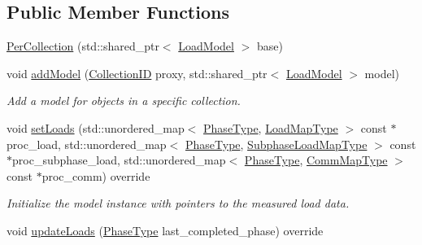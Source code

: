\subsection*{Public Member Functions}
\begin{DoxyCompactItemize}
\item 
\hyperlink{structvt_1_1vrt_1_1collection_1_1balance_1_1_per_collection_aa149a252fec1619bd947e53e3a66b854}{Per\+Collection} (std\+::shared\+\_\+ptr$<$ \hyperlink{classvt_1_1vrt_1_1collection_1_1balance_1_1_load_model}{Load\+Model} $>$ base)
\item 
void \hyperlink{structvt_1_1vrt_1_1collection_1_1balance_1_1_per_collection_a79ecd769664dcaabe413a5d77033b81b}{add\+Model} (\hyperlink{structvt_1_1vrt_1_1collection_1_1balance_1_1_per_collection_ade08a6857f727a0a9d1ef63b25fc5b71}{Collection\+ID} proxy, std\+::shared\+\_\+ptr$<$ \hyperlink{classvt_1_1vrt_1_1collection_1_1balance_1_1_load_model}{Load\+Model} $>$ model)
\begin{DoxyCompactList}\small\item\em Add a model for objects in a specific collection. \end{DoxyCompactList}\item 
void \hyperlink{structvt_1_1vrt_1_1collection_1_1balance_1_1_per_collection_ad749f0ca3690c9e58d4b3ab882ed4cf3}{set\+Loads} (std\+::unordered\+\_\+map$<$ \hyperlink{namespacevt_a46ce6733d5cdbd735d561b7b4029f6d7}{Phase\+Type}, \hyperlink{namespacevt_1_1vrt_1_1collection_1_1balance_a45306ee4bf38fe3fb586d1ee2fa3d147}{Load\+Map\+Type} $>$ const $\ast$proc\+\_\+load, std\+::unordered\+\_\+map$<$ \hyperlink{namespacevt_a46ce6733d5cdbd735d561b7b4029f6d7}{Phase\+Type}, \hyperlink{namespacevt_1_1vrt_1_1collection_1_1balance_a3d91523158c1025b7b665240072f3b7e}{Subphase\+Load\+Map\+Type} $>$ const $\ast$proc\+\_\+subphase\+\_\+load, std\+::unordered\+\_\+map$<$ \hyperlink{namespacevt_a46ce6733d5cdbd735d561b7b4029f6d7}{Phase\+Type}, \hyperlink{namespacevt_1_1vrt_1_1collection_1_1balance_a10860c956804d644db54a16012352728}{Comm\+Map\+Type} $>$ const $\ast$proc\+\_\+comm) override
\begin{DoxyCompactList}\small\item\em Initialize the model instance with pointers to the measured load data. \end{DoxyCompactList}\item 
void \hyperlink{structvt_1_1vrt_1_1collection_1_1balance_1_1_per_collection_a2b41fbbe2b684654f8dbfd9207b77501}{update\+Loads} (\hyperlink{namespacevt_a46ce6733d5cdbd735d561b7b4029f6d7}{Phase\+Type} last\+\_\+completed\+\_\+phase) override

\end{DoxyCompactItemize}
